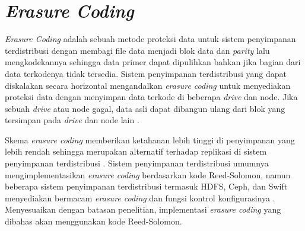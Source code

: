 \section{\textit{Erasure Coding}}
\label{sec:erasure-coding}

\textit{Erasure Coding} adalah sebuah metode proteksi data untuk sistem penyimpanan terdistribusi dengan membagi file data menjadi blok data dan \textit{parity} lalu mengkodekannya sehingga data primer dapat dipulihkan bahkan jika bagian dari data terkodenya tidak tersedia. Sistem penyimpanan terdistribusi yang dapat diskalakan secara horizontal mengandalkan \textit{erasure coding} untuk menyediakan proteksi data dengan menyimpan data terkode di beberapa \textit{drive} dan node. Jika sebuah \textit{drive} atau node gagal, data asli dapat dibangun ulang dari blok yang tersimpan pada \textit{drive} dan node lain \parencite{minio2022erasure}.

Skema \textit{erasure coding} memberikan ketahanan lebih tinggi di penyimpanan yang lebih rendah sehingga merupakan alternatif terhadap replikasi di sistem penyimpanan terdistribusi \parencite{silberstein2014lazy}. Sistem penyimpanan terdistribusi umumnya mengimplementasikan \textit{erasure coding} berdasarkan kode Reed-Solomon, namun beberapa sistem penyimpanan terdistribusi termasuk HDFS, Ceph, dan Swift menyediakan bermacam \textit{erasure coding} dan fungsi kontrol konfigurasinya \parencite{kim2021erasure}. Menyesuaikan dengan batasan penelitian, implementasi \textit{erasure coding} yang dibahas akan menggunakan kode Reed-Solomon.





